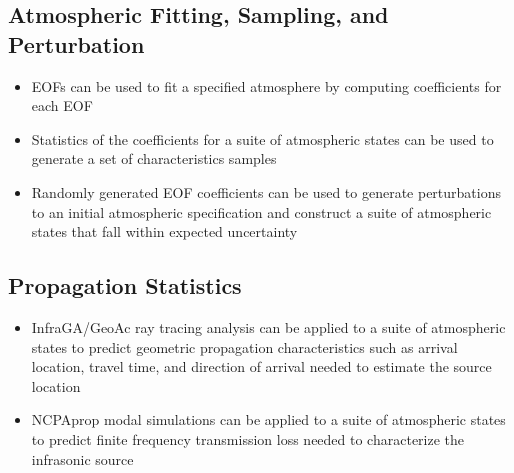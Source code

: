 \documentclass[letterpaper,10pt,english]{sphinxmanual}
\begin{document}
\subsection{Atmospheric Fitting, Sampling, and Perturbation}
\label{\detokenize{analysis:sampling}}\begin{itemize}
\item {} 
\sphinxAtStartPar
EOFs can be used to fit a specified atmosphere by computing coefficients for each EOF

\item {} 
\sphinxAtStartPar
Statistics of the coefficients for a suite of atmospheric states can be used to generate a set of characteristics samples

\item {} 
\sphinxAtStartPar
Randomly generated EOF coefficients can be used to generate perturbations to an initial atmospheric specification and construct a suite of atmospheric states that fall within expected uncertainty

\end{itemize}


\subsection{Propagation Statistics}
\label{\detokenize{analysis:propagation}}\begin{itemize}
\item {} 
\sphinxAtStartPar
InfraGA/GeoAc ray tracing analysis can be applied to a suite of atmospheric states to predict geometric propagation characteristics such as arrival location, travel time, and direction of arrival needed to estimate the source location

\item {} 
\sphinxAtStartPar
NCPAprop modal simulations can be applied to a suite of atmospheric states to predict finite frequency transmission loss needed to characterize the infrasonic source

\end{itemize}
\end{document}
